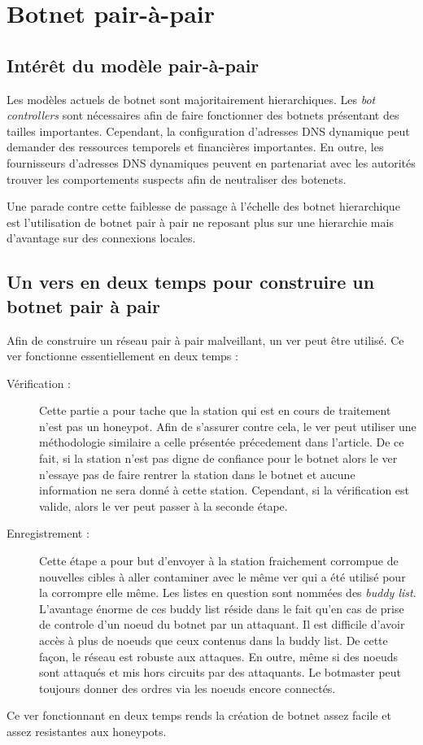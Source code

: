 \section{Botnet pair-à-pair}

\subsection{Intérêt du modèle pair-à-pair}

Les modèles actuels de botnet sont majoritairement hierarchiques. Les \textit{bot
controllers} sont nécessaires afin de faire fonctionner des botnets présentant des
tailles importantes. Cependant, la configuration d'adresses DNS dynamique peut demander
des ressources temporels et financières importantes. En outre, les fournisseurs d'adresses
DNS dynamiques peuvent en partenariat avec les autorités trouver les comportements suspects
afin de neutraliser des botenets.

Une parade contre cette faiblesse de passage à l'échelle des botnet hierarchique est l'utilisation de botnet pair à pair
ne reposant plus sur une hierarchie mais d'avantage sur des connexions locales.


\subsection{Un vers en deux temps pour construire un botnet pair à pair}

Afin de construire un réseau pair à pair malveillant, un ver peut être utilisé.
Ce ver fonctionne essentiellement en deux temps :
\begin{description}
\item[Vérification :] Cette partie a pour tache que la station qui est en cours de traitement
n'est pas un honeypot. Afin de s'assurer contre cela, le ver peut utiliser une méthodologie similaire
a celle présentée précedement dans l'article. De ce fait, si la station n'est pas digne de confiance
pour le botnet alors le ver n'essaye pas de faire rentrer la station dans le botnet et aucune information
ne sera donné à cette station. Cependant, si la vérification est valide, alors le ver peut passer à la seconde
étape.

\item[Enregistrement :] Cette étape a pour but d'envoyer à la station fraichement corrompue de nouvelles cibles
à aller contaminer avec le même ver qui a été utilisé pour la corrompre elle même. Les listes
en question sont nommées des \textit{buddy list}. L'avantage énorme de ces buddy list réside dans le fait qu'en
cas de prise de controle d'un noeud du botnet par un attaquant. Il est difficile d'avoir accès à plus de noeuds
que ceux contenus dans la buddy list. De cette façon, le réseau est robuste aux attaques. En outre, même si des
noeuds sont attaqués et mis hors circuits par des attaquants. Le botmaster peut toujours donner des ordres via
les noeuds encore connectés.
\end{description}


Ce ver fonctionnant en deux temps rends la création de botnet assez facile et assez resistantes aux honeypots.
